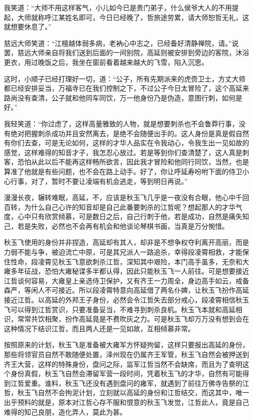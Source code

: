 我笑道：“大师不用这样客气，小儿如今已是贵门弟子，什么侯爷大人的不用提起，大师就称呼江某姓名即可，今日已经晚了，哲旅途劳累，请大师恕哲无礼，这就想要休息了。”

慈远大师笑道：“江檀越体弱多病，老衲心中志之，已经备好清静禅院，请。”说罢，慈远大师亲自将我们送到后面的一间别院，高延则被安排到旁边的客院，沐浴更衣，用过晚饭之后，我坐在窗前看着越来越大的飞雪，陷入沉思。

这时，小顺子已经打理好一切，道：“公子，所有先期派来的虎赍卫士，方丈大师都已经安排妥当，万福寺已在我们控制之下，不过公子今日太冒险了，这个高延来路尚没有查清，公子就和他同车同饮，万一他身份乃是伪造，意图行刺，如何是好。”

我轻笑道：“你过虑了，这样高量雅致的人物，就是想要刺杀也不会鲁莽行事，没有绝对把握刺杀成功并且安然离去，是绝不会随便出手的。这人身份是真是假自然有你们去查，可是无论如何，这样的才华人品实在令我动心，令我生出一见如故的感觉，这样难得的知音才子，我怎忍心放过。若是等到你们查清楚了，这人真是刺客，恐怕从此以后不能再这样畅所欲言，因此我才冒险和他同行同饮，当然，也是算准了他就是有些问题，也不会在路上动手。好了，你让呼延寿吩咐下面的侍卫小心行事，对了，暂时不要让凌端有机会逃走，等到明日再说。”

漫漫长夜，辗转难眠，高延，不，应该是秋玉飞几乎是一夜没有合眼，他心中千回百转，为什么自己心许的知音却是自己此番要刺杀的江哲呢？想起那人的才华气度，心中只有欣赏倾慕，可是数日之后，自己行刺于他，若是成功，自然是痛失知己，若是失败，必然也不会再有机会和他谈论琴棋书画，当真是万分惋惜。

秋玉飞使用的身份并非捏造，高延却有其人，却非是不想争权夺利离开高丽，而是力弱不能与争，被迫流亡中原，可是其兄派人一路追杀，幸得段凌霄相救，才能保住性命，段凌霄见秋玉飞意欲刺杀江哲，深知其中艰险，本门高手虽多，无奈和大雍多年征战，恐怕大雍秘谍多半都认得，因此只能秋玉飞一人前往。可是想要接近江哲谈何容易，大雍皇上亲选侍卫保护，又有齐王一力周全，身边高手如云，戒备森严，等闲人不可接近。所以段凌霄特意向高延借了两名仆婢，让秋玉飞扮作高延接近江哲。以高延的外邦王子身份，必然会令江哲失去部分戒心，段凌霄相信秋玉飞可以得到江哲赏识，只要准备妥当，不难寻到刺杀良机。秋玉飞本就和高延相识，常常共饮相聚，扮作高延竟是不费吹灰之力。可是秋玉飞却万万没有想到会在这种情况下结识江哲，而且两人还是一见如故，互相倾慕非常。

按照原来的计划，秋玉飞是准备被大雍军方怀疑拘留，这样只要报出高延的身份，那些将领官员自然不敢随便处置，泽州现在仍属齐王军管，秋玉飞自然会被押送到齐王大营，这样的特殊身份，盘问之际，监军江哲当然不会缺席，而且为了查明这个身份真假，秋玉飞自然会滞留军营一段时间，凭着秋玉飞的才华，自然有可能得到江哲爱重。谁料，秋玉飞还没有遇到盘问的雍军，就遇到了前往万佛寺告祭的江哲，秋玉飞自然不会拘泥计划，立刻就以高延的身份和江哲结交，而这其中，唯一出乎预料的就是，原本对江哲心存不服和恨意的秋玉飞发觉，江哲此人，竟是自己难得的知己良朋，造化弄人，莫此为甚。

